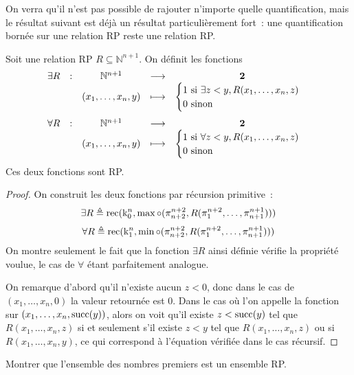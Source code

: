 On verra qu'il n'est pas possible de rajouter n'importe quelle quantification,
mais le résultat suivant est déjà un résultat particulièrement fort~: une
quantification bornée sur une relation RP reste une relation RP.

\begin{proposition}
  Soit une relation RP $R\subseteq \mathbb N^{n+1}$. On définit les fonctions
  \[\begin{array}{ccccc}
  \exists R&:&\mathbb N^{n+1} & \longrightarrow & \boldsymbol{2}\\
  & & (x_1,\ldots,x_n,y) &\longmapsto &
  \begin{cases}
    1 \text{ si } \exists z < y, R(x_1,\ldots,x_n,z)\\
    0 \text{ sinon }
  \end{cases}
  \end{array}\]
  \[\begin{array}{ccccc}
  \forall R & : & \mathbb N^{n+1} & \longrightarrow & \boldsymbol{2}\\
  & & (x_1,\ldots,x_n,y) &\longmapsto &
  \begin{cases}
    1 \text{ si } \forall z < y, R(x_1,\ldots,x_n,z)\\
    0 \text{ sinon }
  \end{cases}
  \end{array}\]
  Ces deux fonctions sont RP.
\end{proposition}

\begin{proof}
  On construit les deux fonctions par récursion primitive~:
  \[\exists R \triangleq \operatorname{rec}(\mathrm k_0^n,\max\circ
  (\pi_{n+2}^{n+2},R(\pi_1^{n+2},\ldots,\pi_{n+1}^{n+1})))\]
  \[\forall R \triangleq \operatorname{rec}(\mathrm k_1^n,\min\circ
  (\pi_{n+2}^{n+2},R(\pi_1^{n+2},\ldots,\pi_{n+1}^{n+1})))\]
  On montre seulement le fait que la fonction $\exists R$ ainsi définie
  vérifie la propriété voulue, le cas de $\forall$ étant parfaitement analogue.

  On remarque d'abord qu'il n'existe aucun $z < 0$, donc dans le cas de
  $(x_1,\ldots,x_n,0)$ la valeur retournée est $0$. Dans le cas où l'on appelle
  la fonction sur $(x_1,\ldots,x_n,\operatorname{succ}(y))$, alors on voit qu'il existe
  $z < \operatorname{succ} (y)$ tel que $R(x_1,\ldots,x_n,z)$ si et seulement s'il existe
  $z < y$ tel que $R(x_1,\ldots,x_n,z)$ ou si $R(x_1,\ldots,x_n,y)$, ce qui
  correspond à l'équation vérifiée dans le cas récursif.
\end{proof}

\begin{exercise}
  Montrer que l'ensemble des nombres premiers est un ensemble RP.
\end{exercise}

